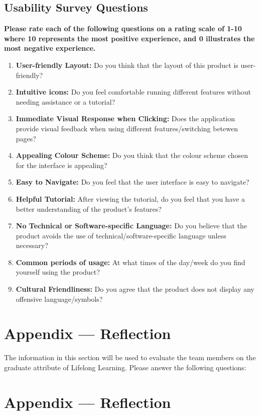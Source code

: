 \documentclass[12pt, titlepage]{article}
\begin{document}
\subsection{Usability Survey Questions}
\label{sec:survey}
\textbf{Please rate each of the following questions on a rating scale of 1-10 where 10 represents the most positive experience, and 0 illustrates the most negative experience.}
\begin{enumerate}
	\item \textbf{User-friendly Layout:} Do you think that the layout of this product is user-friendly?
	\item \textbf{Intuitive icons:} Do you feel comfortable running different features without needing assistance or a tutorial?
	\item \textbf{Immediate Visual Response when Clicking:} Does the application provide visual feedback when using different features/switching betewen pages?
	\item \textbf{Appealing Colour Scheme:} Do you think that the colour scheme chosen for the interface is appealing?
	\item \textbf{Easy to Navigate:} Do you feel that the user interface is easy to navigate?
	\item \textbf{Helpful Tutorial:} After viewing the tutorial, do you feel that you have a better understanding of the product's features?
	\item \textbf{No Technical or Software-specific Language:} Do you believe that the product avoids the use of technical/software-specific language unless necessary?
	\item \textbf{Common periods of usage:} At what times of the day/week do you find yourself using the product?
	\item \textbf{Cultural Friendliness:} Do you agree that the product does not display any offensive language/symbols?
\end{enumerate}

\newpage{}
\section*{Appendix --- Reflection}

The information in this section will be used to evaluate the team members on the
graduate attribute of Lifelong Learning.  Please answer the following questions:

\newpage{}
\section*{Appendix --- Reflection}
\end{document}
